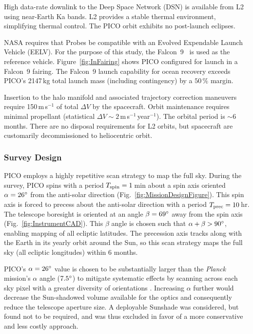 High data-rate downlink to the Deep Space Network (DSN) is available from L2 using near-Earth Ka bands. L2 provides a stable thermal environment, simplifying thermal control. The PICO orbit exhibits no post-launch eclipses.
 
NASA requires that Probes be compatible with an Evolved Expendable Launch Vehicle (EELV). For the purpose of this study, the Falcon~9~\citep{SpaceX2015} is used as the reference vehicle. Figure~\ref{fig:InFairing} shows PICO configured for launch in a Falcon~9 fairing. The Falcon~9 launch capability for ocean recovery exceeds PICO's 2147\,kg total launch mass (including contingency) by a $50\,\%$ margin.

Insertion to the halo manifold and associated trajectory correction maneuvers %
require 150\,m\,s$^{-1}$ of total $\Delta V$ by the spacecraft. Orbit maintenance requires minimal propellant (statistical $\Delta V\sim 2$\,m\,s$^{-1}$\,year$^{-1}$). The orbital period is $\sim6$\,months. There are no disposal requirements for L2 orbits, but spacecraft are customarily decommissioned to heliocentric orbit.


\subsubsection{Survey Design}
\label{sec:survey_design} %
 
PICO employs a highly repetitive scan strategy to map the full
sky. During the survey, PICO spins with a period
$T_{\rm spin} = 1$\,min about a spin axis oriented $\alpha=26^\circ$
from the anti-solar direction (Fig.~\ref{fig:MissionDesignFigure}). This spin axis
is forced to precess about the anti-solar direction with a period
$T_{\rm prec}= 10$\,hr. The telescope boresight is oriented at an
angle $\beta=69^\circ$ away from the spin axis (Fig.~\ref{fig:InstrumentCAD}). This $\beta$ angle is
chosen such that $\alpha + \beta > 90^\circ$, enabling mapping of all
ecliptic latitudes. The precession axis tracks along with the Earth in its
yearly orbit around the Sun, so this scan strategy maps the full sky
(all ecliptic longitudes) within 6 months.

PICO's $\alpha=26^\circ$ value is chosen to be substantially larger than
the \textit{Planck} mission's $\alpha$ angle ($7.5^\circ$) to
mitigate systematic effects by scanning across each sky pixel with a
greater diversity of orientations \citep{Hu2003}. Increasing $\alpha$
further would decrease the Sun-shadowed volume available for the
optics and consequently reduce the telescope aperture size. A
deployable Sunshade was considered, but found not to be required, and
was thus excluded in favor of a more conservative and less costly
approach.

